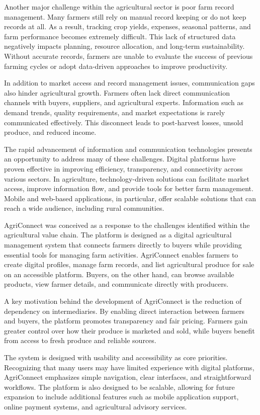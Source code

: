 \documentclass[12pt,a4paper]{article}
\begin{document}
Another major challenge within the agricultural sector is poor farm record management. Many farmers still rely on manual record keeping or do not keep records at all. As a result, tracking crop yields, expenses, seasonal patterns, and farm performance becomes extremely difficult. This lack of structured data negatively impacts planning, resource allocation, and long-term sustainability. Without accurate records, farmers are unable to evaluate the success of previous farming cycles or adopt data-driven approaches to improve productivity.

In addition to market access and record management issues, communication gaps also hinder agricultural growth. Farmers often lack direct communication channels with buyers, suppliers, and agricultural experts. Information such as demand trends, quality requirements, and market expectations is rarely communicated effectively. This disconnect leads to post-harvest losses, unsold produce, and reduced income.

The rapid advancement of information and communication technologies presents an opportunity to address many of these challenges. Digital platforms have proven effective in improving efficiency, transparency, and connectivity across various sectors. In agriculture, technology-driven solutions can facilitate market access, improve information flow, and provide tools for better farm management. Mobile and web-based applications, in particular, offer scalable solutions that can reach a wide audience, including rural communities.

AgriConnect was conceived as a response to the challenges identified within the agricultural value chain. The platform is designed as a digital agricultural management system that connects farmers directly to buyers while providing essential tools for managing farm activities. AgriConnect enables farmers to create digital profiles, manage farm records, and list agricultural produce for sale on an accessible platform. Buyers, on the other hand, can browse available products, view farmer details, and communicate directly with producers.

A key motivation behind the development of AgriConnect is the reduction of dependency on intermediaries. By enabling direct interaction between farmers and buyers, the platform promotes transparency and fair pricing. Farmers gain greater control over how their produce is marketed and sold, while buyers benefit from access to fresh produce and reliable sources.

The system is designed with usability and accessibility as core priorities. Recognizing that many users may have limited experience with digital platforms, AgriConnect emphasizes simple navigation, clear interfaces, and straightforward workflows. The platform is also designed to be scalable, allowing for future expansion to include additional features such as mobile application support, online payment systems, and agricultural advisory services.
\end{document}
